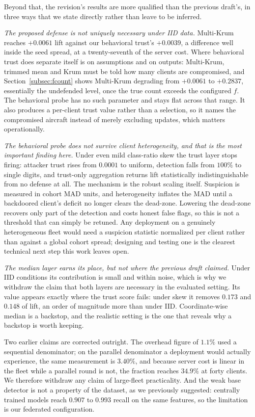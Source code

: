 \documentclass[journal]{IEEEtran}
\begin{document}
Beyond that, the revision's results are more qualified than the previous draft's, in three ways that we state directly rather than leave to be inferred.

\textit{The proposed defense is not uniquely necessary under IID data.} Multi-Krum reaches $+0.0061$ lift against our behavioral trust's $+0.0039$, a difference well inside the seed spread, at a twenty-seventh of the server cost. Where behavioral trust does separate itself is on assumptions and on outputs: Multi-Krum, trimmed mean and Krum must be told how many clients are compromised, and Section~\ref{subsec:fcount} shows Multi-Krum degrading from $+0.0061$ to $+0.2837$, essentially the undefended level, once the true count exceeds the configured $f$. The behavioral probe has no such parameter and stays flat across that range. It also produces a per-client trust value rather than a selection, so it names the compromised aircraft instead of merely excluding updates, which matters operationally.

\textit{The behavioral probe does not survive client heterogeneity, and that is the most important finding here.} Under even mild class-ratio skew the trust layer stops firing: attacker trust rises from $0.0001$ to uniform, detection falls from $100\%$ to single digits, and trust-only aggregation returns lift statistically indistinguishable from no defense at all. The mechanism is the robust scaling itself. Suspicion is measured in cohort MAD units, and heterogeneity inflates the MAD until a backdoored client's deficit no longer clears the dead-zone. Lowering the dead-zone recovers only part of the detection and costs honest false flags, so this is not a threshold that can simply be retuned. Any deployment on a genuinely heterogeneous fleet would need a suspicion statistic normalized per client rather than against a global cohort spread; designing and testing one is the clearest technical next step this work leaves open.

\textit{The median layer earns its place, but not where the previous draft claimed.} Under IID conditions its contribution is small and within noise, which is why we withdraw the claim that both layers are necessary in the evaluated setting. Its value appears exactly where the trust score fails: under skew it removes $0.173$ and $0.148$ of lift, an order of magnitude more than under IID. Coordinate-wise median is a backstop, and the realistic setting is the one that reveals why a backstop is worth keeping.

Two earlier claims are corrected outright. The overhead figure of $1.1\%$ used a sequential denominator; on the parallel denominator a deployment would actually experience, the same measurement is $3.40\%$, and because server cost is linear in the fleet while a parallel round is not, the fraction reaches $34.9\%$ at forty clients. We therefore withdraw any claim of large-fleet practicality. And the weak base detector is not a property of the dataset, as we previously suggested: centrally trained models reach $0.907$ to $0.993$ recall on the same features, so the limitation is our federated configuration.
\end{document}
